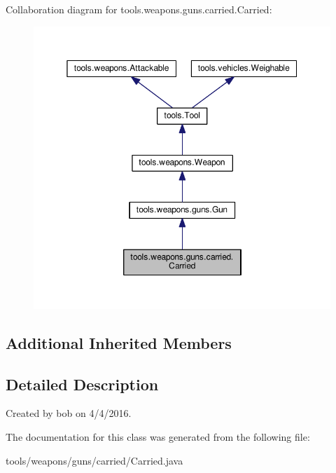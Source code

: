 Collaboration diagram for tools.\+weapons.\+guns.\+carried.\+Carried\+:
\nopagebreak
\begin{figure}[H]
\begin{center}
\leavevmode
\includegraphics[width=350pt]{classtools_1_1weapons_1_1guns_1_1carried_1_1_carried__coll__graph}
\end{center}
\end{figure}
\subsection*{Additional Inherited Members}


\subsection{Detailed Description}
Created by bob on 4/4/2016. 

The documentation for this class was generated from the following file\+:\begin{DoxyCompactItemize}
\item 
tools/weapons/guns/carried/Carried.\+java\end{DoxyCompactItemize}

